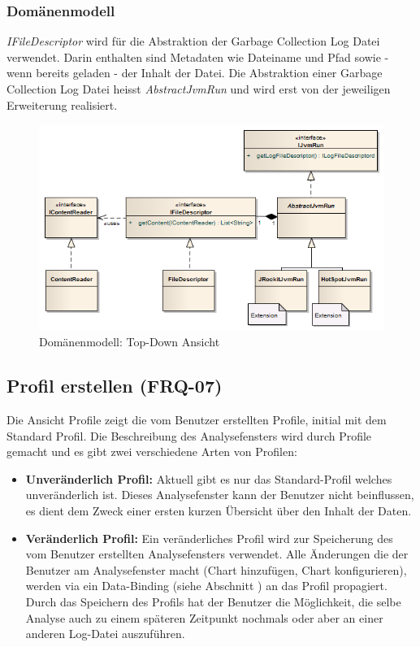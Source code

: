 \subsubsection{Domänenmodell}
\textit{IFileDescriptor} wird für die Abstraktion der Garbage Collection Log Datei verwendet. Darin enthalten sind Metadaten wie Dateiname und Pfad sowie - wenn bereits geladen - der Inhalt der Datei. Die Abstraktion einer Garbage Collection Log Datei heisst \textit{AbstractJvmRun} und wird erst von der jeweiligen Erweiterung realisiert.
 \begin{figure}[H]
  	\centering
    	\includegraphics[width=16cm]{images/core_domain}
        	\caption{Domänenmodell: Top-Down Ansicht}
\end{figure}


\subsection{Profil erstellen (FRQ-07)}
Die Ansicht Profile zeigt die vom Benutzer erstellten Profile, initial mit dem Standard Profil. Die Beschreibung des Analysefensters wird durch Profile gemacht und es gibt zwei verschiedene Arten von Profilen: 
\begin{itemize}
	\item \textbf{Unveränderlich Profil:} Aktuell gibt es nur das Standard-Profil welches unveränderlich ist. Dieses Analysefenster kann der Benutzer nicht beinflussen, es dient dem Zweck einer ersten kurzen Übersicht über den Inhalt der Daten.
	\item \textbf{Veränderlich Profil:} Ein veränderliches Profil wird zur Speicherung des vom Benutzer erstellten Analysefensters verwendet. Alle Änderungen die der Benutzer am Analysefenster macht (Chart hinzufügen, Chart konfigurieren), werden via ein Data-Binding (siehe Abschnitt ) an das Profil propagiert. Durch das Speichern des Profils hat der Benutzer die Möglichkeit, die selbe Analyse auch zu einem späteren Zeitpunkt nochmals oder aber an einer anderen Log-Datei auszuführen.
\end{itemize}

